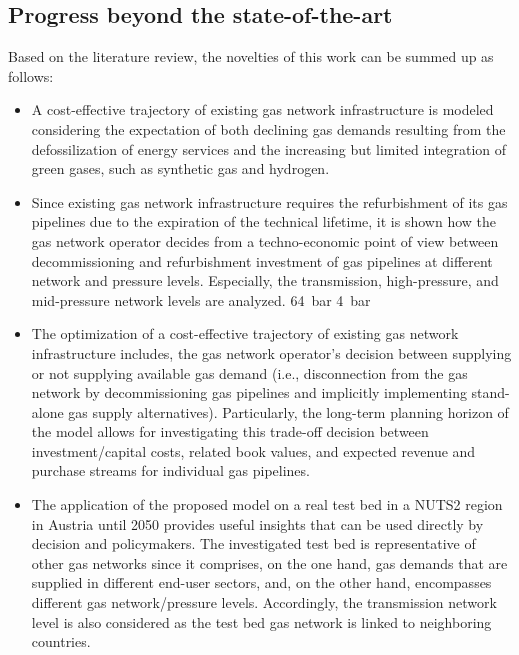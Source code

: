 \subsection{Progress beyond the state-of-the-art}\label{state:3}
Based on the literature review, the novelties of this work can be summed up as follows:
\begin{itemize}
	\item A cost-effective trajectory of existing gas network infrastructure is modeled considering the expectation of both declining gas demands resulting from the defossilization of energy services and the increasing but limited integration of green gases, such as synthetic gas and hydrogen.  
	\item Since existing gas network infrastructure requires the refurbishment of its gas pipelines due to the expiration of the technical lifetime, it is shown how the gas network operator decides from a techno-economic point of view between decommissioning and refurbishment investment of gas pipelines at different network and pressure levels. Especially, the transmission, high-pressure, and mid-pressure network levels are analyzed.  \SI{64}{bar}  \SI{4}{bar} 
	\item The optimization of a cost-effective trajectory of existing gas network infrastructure includes, the gas network operator's decision between supplying or not supplying available gas demand (i.e., disconnection from the gas network by decommissioning gas pipelines and implicitly implementing stand-alone gas supply alternatives). Particularly, the long-term planning horizon of the model allows for investigating this trade-off decision between investment/capital costs, related book values, and expected revenue and purchase streams for individual gas pipelines.
	\item The application of the proposed model on a real test bed in a NUTS2 region in Austria until 2050 provides useful insights that can be used directly by decision and policymakers. The investigated test bed is representative of other gas networks since it comprises, on the one hand, gas demands that are supplied in different end-user sectors, and, on the other hand, encompasses different gas network/pressure levels. Accordingly, the transmission network level is also considered as the test bed gas network is linked to neighboring countries.  
\end{itemize}